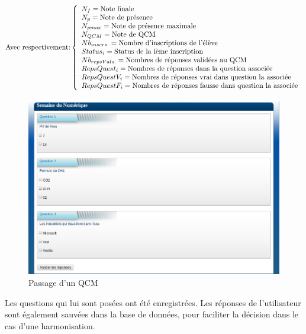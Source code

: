 $$
\text{Avec respectivement:}
\left\{
\begin{array}{l l l l l l l l}
N_{f} = \text{Note finale}\\
N_{p} = \text{Note de présence}\\
N_{pmax} = \text{Note de présence maximale}\\
N_{QCM} = \text{Note de QCM}\\
Nb_{inscrs.} = \text{Nombre d'inscriptions de l'élève}\\
Status_{i} = \text{Status de la ième inscription}\\
Nb_{repsVals.} = \text{Nombres de réponses validées au QCM}\\
RepsQuest_{i} = \text{Nombres de réponses dans la question associée}\\
RepsQuestV_{i} = \text{Nombres de réponses vrai dans question la associée}\\
RepsQuestF_{i} = \text{Nombres de réponses fausse dans question la associée}\\
\end{array}
\right.
$$

    \begin{figure}[h]
        \begin{center}
        \includegraphics[scale=0.4]{images/screenshotQCM.png} 
        \end{center}
        \caption{Passage d'un QCM}
        \label{Passage d'un QCM}
    \end{figure}

Les questions qui lui sont posées ont été enregistrées. Les réponses de l'utilisateur sont également sauvées dans la base de données,
pour faciliter la décision dans le cas d'une harmonisation.

